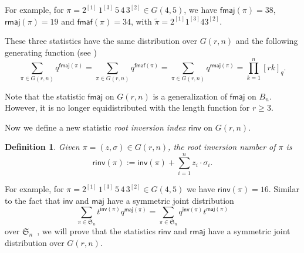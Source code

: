 \documentclass[a4paper, reqno, 11pt]{amsart}
\newtheorem{defi}[lem]{Definition}
\newcommand{\maj}{{\textsf{maj}}}
\newcommand{\inv}{{\textsf{inv}}}
\newcommand{\fmaj}{{\textsf{fmaj}}}
\newcommand{\rmaj}{{\textsf{rmaj}}}
\newcommand{\fmaf}{{\textsf{fmaf}}}
\newcommand{\rinv}{{\textsf{rinv}}}
\numberwithin{equation}{section}
\begin{document}
For example, for $\pi=2^{[1]}\,1^{[3]}\,5\,4\,3^{[2]} \in G(4,5)$, we have $\fmaj(\pi)=38$, $\rmaj(\pi)=19$ and $\fmaf(\pi)=34$, with $\tilde{\pi} = 2^{[1]} 1^{[3]} 43^{[2]}$.

These three statistics have the same distribution over $G(r,n)$ and the following generating function (see \cite{Haglund_Loehr_Remmel_05, Faliharimalala_Zeng_11})
\begin{equation}\label{eq:Grn}
\sum_{\pi\in G(r,n)} q^{\fmaj(\pi)}=\sum_{\pi\in G(r,n)} q^{\fmaf(\pi)}
=\sum_{\pi\in G(r,n)} q^{\rmaj(\pi)}=\prod_{k=1}^n[rk]_q.
\end{equation}

Note that the statistic $\fmaj$ on $G(r,n)$ is a generalization of $\fmaj$ on $B_n$. 
However, it is no longer equidistributed with the length function for $r\geq 3$.

Now we define a new statistic \emph{root inversion index} $\rinv$ on $G(r,n)$.

\begin{defi} Given $\pi=(z,\sigma)\in G(r,n)$, the \emph{root inversion number} of $\pi$ is
$$\rinv(\pi):=\inv(\pi)+\sum_{i=1}^n z_i\cdot \sigma_i.$$
\end{defi}

For example, for $\pi=2^{[1]}\,1^{[3]}\,5\,4\,3^{[2]} \in G(4,5)$ we have $\rinv(\pi)=16$. 
Similar to the fact that $\inv$ and $\maj$ have a symmetric joint distribution
\begin{equation}\label{eq:invmaj_sym}
\sum_{\pi\in \mathfrak{S}_n}t^{\inv(\pi)}q^{\maj(\pi)}=\sum_{\pi\in \mathfrak{S}_n}q^{\inv(\pi)}t^{\maj(\pi)}
\end{equation}
over $\mathfrak{S}_n$~\cite{Foata_Sch_78}, we will prove that the statistics $\rinv$ and $\rmaj$ have a symmetric joint distribution over $G(r,n)$.
\end{document}
